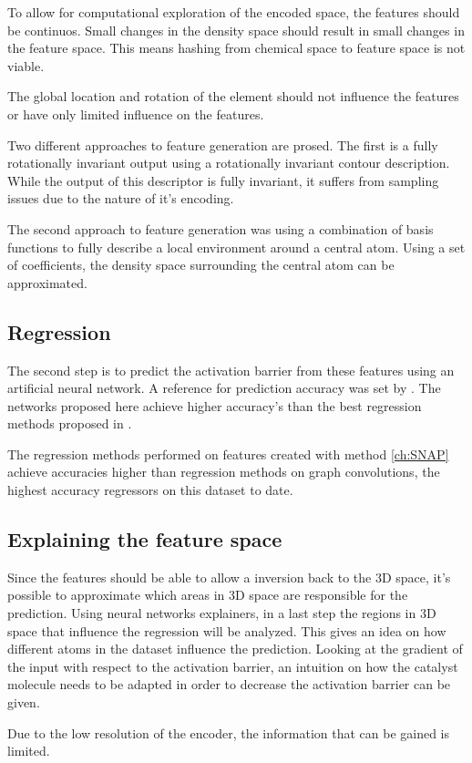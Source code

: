 To allow for computational exploration of the encoded space, the features should be continuos.
Small changes in the density space should result in small changes in the 
feature space. 
This means hashing from chemical space to feature space is not viable.

The global location and rotation of the element should not influence the features or have only limited influence on the features.

Two different approaches to feature generation are prosed.
The first is a fully rotationally invariant output using a rotationally invariant contour description.
While the output of this descriptor is fully invariant, it suffers from sampling issues due to the nature of it's encoding.

The second approach to feature generation was using a combination of basis functions to fully describe a local environment around a central atom.
Using a set of coefficients, the density space surrounding the central atom can be approximated.

\subsection{Regression}

The second step is to predict the activation barrier from these features using an artificial neural network.
A reference for prediction accuracy was set by \cite{friederich_dos}.
The networks proposed here achieve higher accuracy's than the best regression methods proposed in \cite{friederich_dos}.

The regression methods performed on features created with method \ref{ch:SNAP} achieve accuracies higher than regression methods on graph convolutions,
the highest accuracy regressors on this dataset to date.

\subsection{Explaining the feature space}
Since the features should be able to allow a inversion back to the 3D space, it's possible to approximate which areas in 3D space are responsible for the prediction.
Using neural networks explainers, in  a last step the regions in 3D space that influence the regression will be analyzed.
This gives an idea on how different atoms in the dataset influence the prediction.
Looking at the gradient of the input with respect to the activation barrier, an intuition on how the catalyst molecule needs to be 
adapted in order to decrease the activation barrier can be given.

Due to the low resolution of the encoder, the information that can be gained is limited.